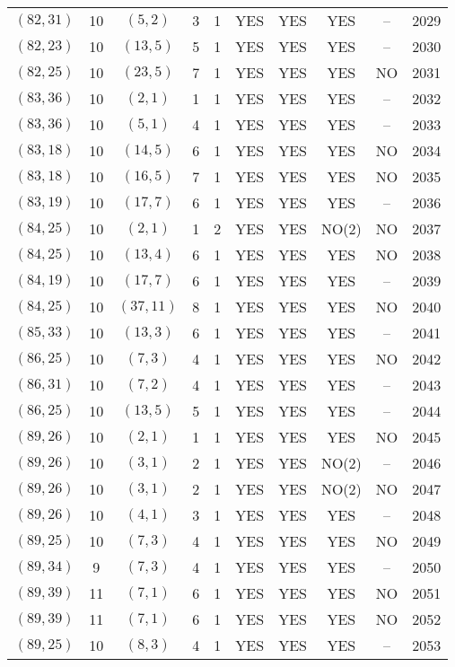 \begin{longtable}{|c|c|c|c|c|c|c|c|c|c|}
$(82, 31)$ & 10 & $(5, 2)$ & 3 & 1 & YES & YES & YES & -- & 2029\\
$(82, 23)$ & 10 & $(13, 5)$ & 5 & 1 & YES & YES & YES & -- & 2030\\
$(82, 25)$ & 10 & $(23, 5)$ & 7 & 1 & YES & YES & YES & NO & 2031\\
$(83, 36)$ & 10 & $(2, 1)$ & 1 & 1 & YES & YES & YES & -- & 2032\\
$(83, 36)$ & 10 & $(5, 1)$ & 4 & 1 & YES & YES & YES & -- & 2033\\
$(83, 18)$ & 10 & $(14, 5)$ & 6 & 1 & YES & YES & YES & NO & 2034\\
$(83, 18)$ & 10 & $(16, 5)$ & 7 & 1 & YES & YES & YES & NO & 2035\\
$(83, 19)$ & 10 & $(17, 7)$ & 6 & 1 & YES & YES & YES & -- & 2036\\
$(84, 25)$ & 10 & $(2, 1)$ & 1 & 2 & YES & YES & NO(2) & NO & 2037\\
$(84, 25)$ & 10 & $(13, 4)$ & 6 & 1 & YES & YES & YES & NO & 2038\\
$(84, 19)$ & 10 & $(17, 7)$ & 6 & 1 & YES & YES & YES & -- & 2039\\
$(84, 25)$ & 10 & $(37, 11)$ & 8 & 1 & YES & YES & YES & NO & 2040\\
$(85, 33)$ & 10 & $(13, 3)$ & 6 & 1 & YES & YES & YES & -- & 2041\\
$(86, 25)$ & 10 & $(7, 3)$ & 4 & 1 & YES & YES & YES & NO & 2042\\
$(86, 31)$ & 10 & $(7, 2)$ & 4 & 1 & YES & YES & YES & -- & 2043\\
$(86, 25)$ & 10 & $(13, 5)$ & 5 & 1 & YES & YES & YES & -- & 2044\\
$(89, 26)$ & 10 & $(2, 1)$ & 1 & 1 & YES & YES & YES & NO & 2045\\
$(89, 26)$ & 10 & $(3, 1)$ & 2 & 1 & YES & YES & NO(2) & -- & 2046\\
$(89, 26)$ & 10 & $(3, 1)$ & 2 & 1 & YES & YES & NO(2) & NO & 2047\\
$(89, 26)$ & 10 & $(4, 1)$ & 3 & 1 & YES & YES & YES & -- & 2048\\
$(89, 25)$ & 10 & $(7, 3)$ & 4 & 1 & YES & YES & YES & NO & 2049\\
$(89, 34)$ & 9 & $(7, 3)$ & 4 & 1 & YES & YES & YES & -- & 2050\\
$(89, 39)$ & 11 & $(7, 1)$ & 6 & 1 & YES & YES & YES & NO & 2051\\
$(89, 39)$ & 11 & $(7, 1)$ & 6 & 1 & YES & YES & YES & NO & 2052\\
$(89, 25)$ & 10 & $(8, 3)$ & 4 & 1 & YES & YES & YES & -- & 2053\\

\end{longtable}
